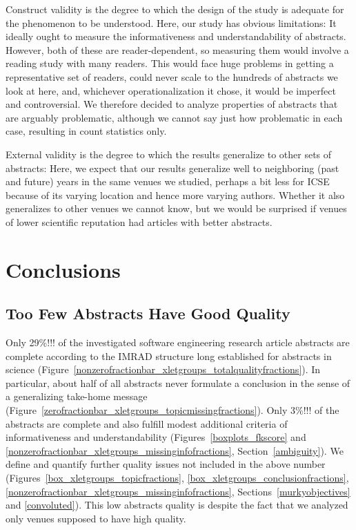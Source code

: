 \documentclass[10pt,journal,compsoc]{IEEEtran}
\begin{document}
Construct validity is the degree to which the design
of the study is adequate for the phenomenon to be understood.
Here, our study has obvious limitations:
It ideally ought to measure the informativeness and understandability of
abstracts. However, both of these are reader-dependent, so
measuring them would involve a reading study with many readers.
This would face huge problems in getting a representative set of readers,
could never scale to the hundreds of abstracts we look at here,
and, whichever operationalization it chose,
it would be imperfect and controversial.
We therefore decided to analyze properties of abstracts
that are arguably problematic, although we cannot say just how
problematic in each case, resulting in count statistics only.

External validity is the degree to which the results generalize
to other sets of abstracts:
Here, we expect that our results generalize well to
neighboring (past and future) years in the same venues
we studied, perhaps a bit less for ICSE because of its
varying location and hence more varying authors.
Whether it also generalizes to other venues
we cannot know, but we would be surprised if venues of lower
scientific reputation had articles with better abstracts.


\section{Conclusions}


\subsection{Too Few Abstracts Have Good Quality}

Only 29\%!!! of the investigated software engineering research article abstracts are 
complete according to the IMRAD structure long established for abstracts in science
(Figure~\ref{nonzerofractionbar_xletgroups_totalqualityfractions}).
In particular, about half of all abstracts never formulate a conclusion in the sense of
a generalizing take-home message (Figure~\ref{zerofractionbar_xletgroups_topicmissingfractions}).
Only 3\%!!! of the abstracts are complete and also fulfill modest additional criteria of 
informativeness and understandability 
(Figures~\ref{boxplots_fkscore} and \ref{nonzerofractionbar_xletgroups_missinginfofractions}, 
Section~\ref{ambiguity}).
We define and quantify further quality issues not included in the above number 
(Figures~\ref{box_xletgroups_topicfractions}, \ref{box_xletgroups_conclusionfractions}, 
\ref{nonzerofractionbar_xletgroups_missinginfofractions}, 
Sections~\ref{murkyobjectives} and \ref{convoluted}).
This low abstracts quality is despite the fact that we analyzed only venues
supposed to have high quality.
\end{document}
